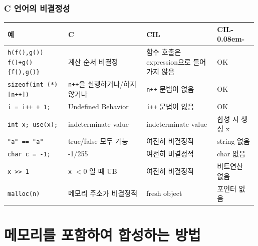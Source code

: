 \documentclass{simplesnt}
\newcommand{\CILmm}{\texorpdfstring{CIL-\kern0.08em-}{CIL--}}
\newcommand{\fainttablerow}{\\[0.2ex]\arrayrulecolor{black!12}\hline\arrayrulecolor{black}}
\begin{document}
\begin{frame}
  \frametitle{C 언어의 비결정성}

  {\scriptsize
  \centering
  \setlength{\tabcolsep}{2.0pt}
  \renewcommand{\arraystretch}{1.08}
  \begin{tabular}{@{}p{0.24\linewidth}p{0.31\linewidth}p{0.28\linewidth}p{0.16\linewidth}@{}}
    \toprule
    \textbf{예} & \textbf{C} & \textbf{CIL} & \textbf{\CILmm{}} \\
    \midrule
    \texttt{h(f(),g())} \newline \texttt{f()+g()} \newline \texttt{\{f(),g()\}} & 계산 순서 비결정 & 함수 호출은 expression으로 들어가지 않음 & OK \fainttablerow
    \texttt{sizeof(int (*)[n++])} & \texttt{n++}을 실행하거나/하지 않거나 & \texttt{n++} 문법이 없음 & OK \fainttablerow
    \texttt{i = i++ + 1;} & Undefined Behavior & \texttt{i++} 문법이 없음 & OK \fainttablerow
    \texttt{int x; use(x);} & indeterminate value & indeterminate value & 합성 시 생성 x\fainttablerow
    \texttt{"a" == "a"} & true/false 모두 가능 & 여전히 비결정적 & string 없음 \fainttablerow
    \texttt{char c = -1;} & -1/255 & 여전히 비결정적 & char 없음 \fainttablerow
    \texttt{x >> 1} & \texttt{x} $< 0$ 일 때 UB & 여전히 비결정적 & 비트연산 없음 \fainttablerow
    \texttt{malloc(n)} & 메모리 주소가 비결정적 & fresh object & 포인터 없음 \\
    \bottomrule
  \end{tabular}
  }

\end{frame}

\section{메모리를 포함하여 합성하는 방법}
\end{document}

